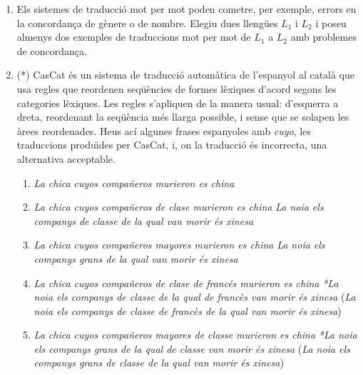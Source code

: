 \begin{enumerate}
\item Els sistemes de traducció mot per mot poden cometre, per
  exemple, errors en la concordança de gènere o de nombre.  Elegiu
  dues llengües $L_1$ i $L_2$ i poseu almenys dos exemples de
  traduccions mot per mot de $L_1$ a $L_2$ amb problemes de concordança.

\item (*) \label{ex:cascat} CasCat és un sistema de traducció automàtica
  de l'espanyol al català que usa regles que reordenen seqüències de
  formes lèxiques d'acord segons les categories lèxiques. Les regles
  s'apliquen de la manera usual: d'esquerra a dreta, reordenant la
  seqüència més llarga possible, i sense que se solapen les àrees
  reordenades.  Heus ací algunes frases espanyoles amb {\em cuyo}, les
  traduccions produ\"{\i}des per CasCat, i, on la traducció és
  incorrecta, una alternativa acceptable.
\begin{enumerate}
  
\item \emph{La chica cuyos compañeros murieron es china} 

\item \emph{La chica cuyos compañeros de clase murieron es china}
  \newline \emph{La noia els companys de classe de la qual van morir és
    xinesa}

\item \emph{La chica cuyos compañeros mayores murieron es china}
  \newline \emph{La noia els companys grans de la qual van morir és
    xinesa}

\item \emph{La chica cuyos compañeros de clase de francés murieron es
    china} \newline \emph{*La noia els companys de classe de la qual de
    francès van morir és xinesa} \newline (\emph{La noia els companys
    de classe de francès de la qual van morir és xinesa})

\item \emph{La chica cuyos compañeros mayores de classe murieron es
    china} \newline \emph{*La noia els companys grans de la qual de
    classe van morir és xinesa} \newline (\emph{La noia els companys grans de
    classe de la qual van morir és xinesa})


\end{enumerate}
\end{enumerate}
